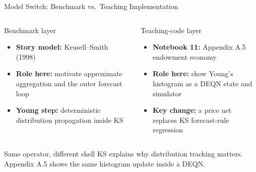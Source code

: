 \documentclass[aspectratio=169,11pt]{beamer}
\newcommand{\emphc}[1]{\textcolor{harvardcrimson}{#1}}
\begin{document}
\begin{frame}{Model Switch: Benchmark vs.\ Teaching Implementation}
\footnotesize
\begin{columns}[T]
\begin{block}{Benchmark layer}
\begin{itemize}\itemsep1pt
    \item \textbf{Story model:} Krusell--Smith (1998)
    \item \textbf{Role here:} motivate approximate aggregation and the outer forecast loop
    \item \textbf{Young step:} deterministic distribution propagation inside KS
\end{itemize}
\end{block}

\begin{block}{Teaching-code layer}
\begin{itemize}\itemsep1pt
    \item \textbf{Notebook 11:} Appendix A.5 endowment economy
    \item \textbf{Role here:} show Young's histogram as a DEQN state and simulator
    \item \textbf{Key change:} a price net replaces KS forecast-rule regression
\end{itemize}
\end{block}
\end{columns}

\vspace{0.25em}
\begin{alertblock}{Same operator, different shell}
KS explains \emphc{why} distribution tracking matters. Appendix A.5 shows the same histogram update \emphc{inside} a DEQN.
\end{alertblock}
\end{frame}
\end{document}
